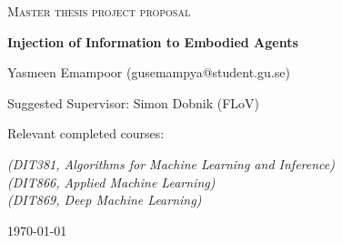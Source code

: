 \documentclass{article}
\begin{document}
\begin{titlepage}
  

\centering
  
  
{\scshape\LARGE Master thesis project proposal\\}
  
\vspace{0.5cm}
  
{\huge\bfseries Injection of Information to Embodied Agents\\}

  
\vspace{2cm}
  
{\Large Yasmeen Emampoor (gusemampya@student.gu.se)\\}
  
\vspace{1.0cm}
  
{\large Suggested Supervisor: Simon Dobnik (FLoV)\\}
  
\vspace{1.5cm}
  
  
{\large Relevant completed courses:\par}
{\itshape (DIT381, Algorithms for Machine Learning and Inference)\\ (DIT866, Applied Machine Learning) \\ (DIT869, Deep Machine Learning)}
  
\vspace{1.5cm}
  
\vfill

\vfill
  
{\large \today\\} 


\end{titlepage}
\end{document}

